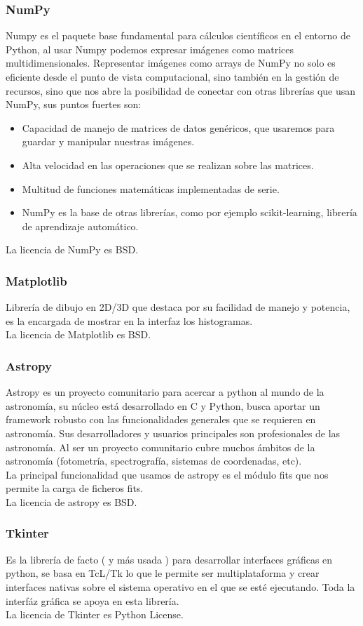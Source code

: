 	\subsubsection{NumPy}
	Numpy es el paquete base fundamental para cálculos científicos en el entorno de Python, al usar Numpy podemos expresar imágenes como matrices multidimensionales. Representar imágenes como arrays de NumPy no solo es eficiente desde el punto de vista computacional, sino también en la gestión de recursos, sino que nos abre la posibilidad de conectar con otras librerías que usan NumPy, sus puntos fuertes son:
	\begin{itemize}
		\item Capacidad de manejo de matrices de datos genéricos, que usaremos para guardar y manipular nuestras imágenes.
		\item Alta velocidad en las operaciones que se realizan sobre las matrices.
		\item Multitud de funciones matemáticas implementadas de serie.
		\item NumPy es la base de otras librerías, como por ejemplo scikit-learning, librería de aprendizaje automático.
	\end{itemize}
	La licencia de NumPy es BSD.
	\subsubsection{Matplotlib}
	Librería de dibujo en 2D/3D que destaca por su facilidad de manejo y potencia, es la encargada de mostrar en la interfaz los histogramas.\\
	La licencia de Matplotlib es BSD.
	\subsubsection{Astropy}
	Astropy es un proyecto comunitario para acercar a python al mundo de la astronomía, su núcleo está desarrollado en C y Python, busca aportar un framework robusto con las funcionalidades generales que se requieren en astronomía. Sus desarrolladores y usuarios principales son profesionales de las astronomía. Al ser un proyecto comunitario cubre muchos ámbitos de la astronomía (fotometría, spectrografía, sistemas de coordenadas, etc).\\
	La principal funcionalidad que usamos de astropy es el módulo fits que nos permite la carga de ficheros fits.\\
	La licencia de astropy es BSD.\\
	\subsubsection{Tkinter}
	Es la librería de facto ( y más usada ) para desarrollar interfaces gráficas en python, se basa en TcL/Tk lo que le permite ser multiplataforma y crear interfaces nativas sobre el sistema operativo en el que se esté ejecutando. Toda la interfáz gráfica se apoya en esta librería.\\	
	La licencia de Tkinter es Python License.
